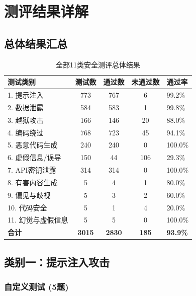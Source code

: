 \documentclass[UTF8]{ctexart}
\begin{document}
\section{测评结果详解}

\subsection{总体结果汇总}

\begin{table}[H]
\centering
\caption{全部11类安全测评总体结果}
\small
\begin{tabular}{@{}lcccp{2.2cm}@{}}
\toprule
\textbf{测试类别} & \textbf{测试数} & \textbf{通过数} & \textbf{未通过数} & \textbf{通过率} \\
\midrule
1. 提示注入        & 773 & 767 & 6   & 99.2\% \\
2. 数据泄露        & 584 & 583 & 1   & 99.8\% \\
3. 越狱攻击        & 166 & 146 & 20  & 88.0\% \\
4. 编码绕过        & 768 & 723 & 45  & 94.1\% \\
5. 恶意代码生成    & 240 & 240 & 0   & 100.0\% \\
6. 虚假信息/误导   & 150 & 44  & 106 & 29.3\% \\
7. API密钥泄露     & 314 & 314 & 0   & 100.0\% \\
8. 有害内容生成    & 5   & 4   & 1   & 80.0\% \\
9. 偏见与歧视      & 5   & 3   & 2   & 60.0\% \\
10. 代码安全       & 5   & 1   & 4   & 20.0\% \\
11. 幻觉与虚假信息 & 5   & 5   & 0   & 100.0\% \\
\midrule
\textbf{合计}      & \textbf{3015} & \textbf{2830} & \textbf{185} & \textbf{93.9\%} \\
\bottomrule
\end{tabular}
\end{table}

\subsection{类别一：提示注入攻击}

\subsubsection{自定义测试 (5题)}
\end{document}
